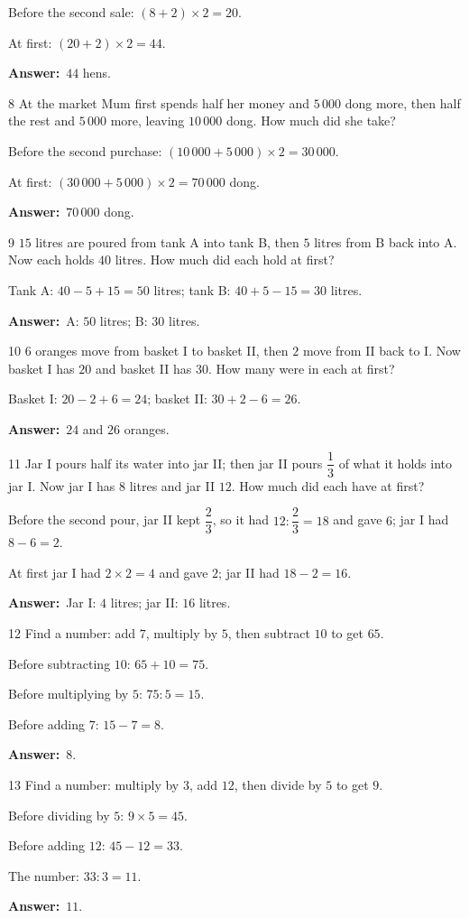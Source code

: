 \documentclass[11pt]{article}
\newif\ifsol \solfalse
\providecommand{\AnsWord}{Đáp số}
\newcommand{\dapso}[1]{\par\textbf{\AnsWord:}\ #1}
\newcommand{\probsol}[1]{%
  \begin{lrbox}{\solmeasure}\begin{minipage}{\dimexpr\linewidth-24pt\relax}#1\end{minipage}\end{lrbox}%
  \ifsol
    \begin{solbox}#1\end{solbox}%
  \else
    \setlength{\solht}{\dimexpr\ht\solmeasure+\dp\solmeasure+0.85cm\relax}%
    \ifdim\solht<1.35cm\setlength{\solht}{1.35cm}\fi
    \begin{tcolorbox}[colback=white,colframe=Line,boxrule=0.8pt,arc=5pt,
      left=8pt,right=8pt,top=4pt,bottom=4pt,height=\solht]{\footnotesize\color{Slate}\itshape\WorkWord}\end{tcolorbox}%
  \fi}
\newcommand{\gap}{\vspace{0.3cm}}
\def\WorkWord{Your work:}
\def\AnsWord{Answer}
\begin{document}
\probsol{
Before the second sale: $(8+2)\times2=20$.\par At first: $(20+2)\times2=44$.
\dapso{$44$ hens.}}
\gap
\begin{probbox}{8}{\relax}
At the market Mum first spends half her money and $5\,000$ dong more, then half the rest and $5\,000$ more, leaving $10\,000$ dong. How much did she take?
\end{probbox}
\probsol{
Before the second purchase: $(10\,000+5\,000)\times2=30\,000$.\par At first: $(30\,000+5\,000)\times2=70\,000$ dong.
\dapso{$70\,000$ dong.}}
\gap
\begin{probbox}{9}{\relax}
$15$ litres are poured from tank A into tank B, then $5$ litres from B back into A. Now each holds $40$ litres. How much did each hold at first?
\end{probbox}
\probsol{
Tank A: $40-5+15=50$ litres; tank B: $40+5-15=30$ litres.
\dapso{A: $50$ litres; B: $30$ litres.}}
\gap
\begin{probbox}{10}{\relax}
$6$ oranges move from basket I to basket II, then $2$ move from II back to I. Now basket I has $20$ and basket II has $30$. How many were in each at first?
\end{probbox}
\probsol{
Basket I: $20-2+6=24$; basket II: $30+2-6=26$.
\dapso{$24$ and $26$ oranges.}}
\gap
\begin{probbox}{11}{\relax}
Jar I pours half its water into jar II; then jar II pours $\dfrac13$ of what it holds into jar I. Now jar I has $8$ litres and jar II $12$. How much did each have at first?
\end{probbox}
\probsol{
Before the second pour, jar II kept $\dfrac23$, so it had $12:\dfrac23=18$ and gave $6$; jar I had $8-6=2$.\par
At first jar I had $2\times2=4$ and gave $2$; jar II had $18-2=16$.
\dapso{Jar I: $4$ litres; jar II: $16$ litres.}}
\gap
\begin{probbox}{12}{\relax}
Find a number: add $7$, multiply by $5$, then subtract $10$ to get $65$.
\end{probbox}
\probsol{
Before subtracting $10$: $65+10=75$.\par Before multiplying by $5$: $75:5=15$.\par Before adding $7$: $15-7=8$.
\dapso{$8$.}}
\gap
\begin{probbox}{13}{\relax}
Find a number: multiply by $3$, add $12$, then divide by $5$ to get $9$.
\end{probbox}
\probsol{
Before dividing by $5$: $9\times5=45$.\par Before adding $12$: $45-12=33$.\par The number: $33:3=11$.
\dapso{$11$.}}
\end{document}
